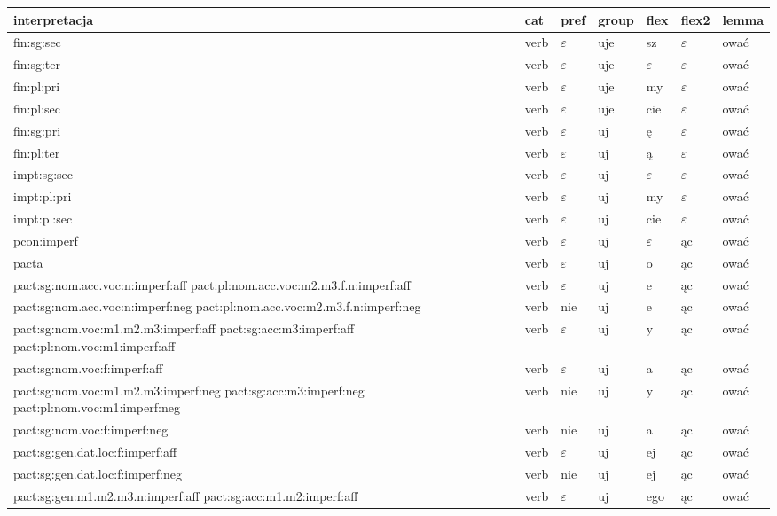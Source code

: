 \documentclass{article}
\begin{document}
\begin{longtable}{p{7cm}|l|l|l|l|l|l}
interpretacja & cat & pref & group & flex & flex2 & lemma\\
\hline
fin:sg:sec & verb & $\varepsilon$ & uje & sz & $\varepsilon$ & ować\\
fin:sg:ter & verb & $\varepsilon$ & uje & $\varepsilon$ & $\varepsilon$ & ować\\
fin:pl:pri & verb & $\varepsilon$ & uje & my & $\varepsilon$ & ować\\
fin:pl:sec & verb & $\varepsilon$ & uje & cie & $\varepsilon$ & ować\\
fin:sg:pri & verb & $\varepsilon$ & uj & ę & $\varepsilon$ & ować\\
fin:pl:ter & verb & $\varepsilon$ & uj & ą & $\varepsilon$ & ować\\
impt:sg:sec & verb & $\varepsilon$ & uj & $\varepsilon$ & $\varepsilon$ & ować\\
impt:pl:pri & verb & $\varepsilon$ & uj & my & $\varepsilon$ & ować\\
impt:pl:sec & verb & $\varepsilon$ & uj & cie & $\varepsilon$ & ować\\
pcon:imperf & verb & $\varepsilon$ & uj & $\varepsilon$ & ąc & ować\\
pacta & verb & $\varepsilon$ & uj & o & ąc & ować\\
pact:sg:nom.acc.voc:n:imperf:aff pact:pl:nom.acc.voc:m2.m3.f.n:imperf:aff & verb & $\varepsilon$ & uj & e & ąc & ować\\
pact:sg:nom.acc.voc:n:imperf:neg pact:pl:nom.acc.voc:m2.m3.f.n:imperf:neg & verb & nie & uj & e & ąc & ować\\
pact:sg:nom.voc:m1.m2.m3:imperf:aff pact:sg:acc:m3:imperf:aff pact:pl:nom.voc:m1:imperf:aff & verb & $\varepsilon$ & uj & y & ąc & ować\\
pact:sg:nom.voc:f:imperf:aff & verb & $\varepsilon$ & uj & a & ąc & ować\\
pact:sg:nom.voc:m1.m2.m3:imperf:neg pact:sg:acc:m3:imperf:neg pact:pl:nom.voc:m1:imperf:neg & verb & nie & uj & y & ąc & ować\\
pact:sg:nom.voc:f:imperf:neg & verb & nie & uj & a & ąc & ować\\
pact:sg:gen.dat.loc:f:imperf:aff & verb & $\varepsilon$ & uj & ej & ąc & ować\\
pact:sg:gen.dat.loc:f:imperf:neg & verb & nie & uj & ej & ąc & ować\\
pact:sg:gen:m1.m2.m3.n:imperf:aff pact:sg:acc:m1.m2:imperf:aff & verb & $\varepsilon$ & uj & ego & ąc & ować\\

\end{longtable}
\end{document}
